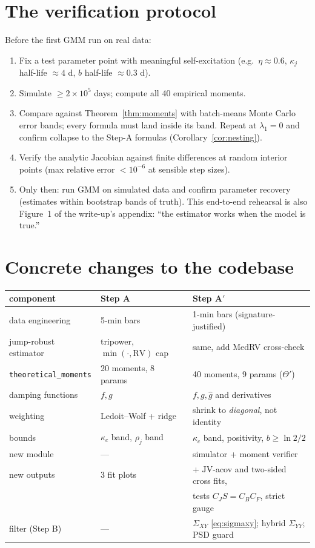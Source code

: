 \documentclass[11pt]{report}
\theoremstyle{definition}
\theoremstyle{remark}
\newcommand{\JV}{\mathrm{JV}}
\newcommand{\RV}{\mathrm{RV}}
\begin{document}
\section{The verification protocol}

Before the first GMM run on real data:
\begin{enumerate}
\item Fix a test parameter point with meaningful self-excitation
(e.g.\ $\eta\approx0.6$, $\kappa_{j}$ half-life $\approx4$ d, $b$ half-life
$\approx0.3$ d).
\item Simulate $\ge2\times10^{5}$ days; compute all 40 empirical moments.
\item Compare against Theorem~\ref{thm:moments} with batch-means Monte Carlo
error bands; every formula must land inside its band. Repeat at
$\lambda_{1}=0$ and confirm collapse to the Step-A formulas
(Corollary~\ref{cor:nesting}).
\item Verify the analytic Jacobian against finite differences at random
interior points (max relative error $<10^{-6}$ at sensible step sizes).
\item Only then: run GMM on simulated data and confirm parameter recovery
(estimates within bootstrap bands of truth). This end-to-end rehearsal is
also Figure~1 of the write-up's appendix: ``the estimator works when the
model is true.''
\end{enumerate}

\section{Concrete changes to the codebase}

\begin{center}
\small
\begin{tabular}{lll}
\toprule
component & Step A & Step A$'$\\
\midrule
data engineering & 5-min bars & 1-min bars (signature-justified)\\
jump-robust estimator & tripower, $\min(\cdot,\RV)$ cap & same, add MedRV cross-check\\
\texttt{theoretical\_moments} & 20 moments, 8 params & 40 moments, 9 params ($\Theta'$)\\
damping functions & $f,g$ & $f,g,\hat g$ and derivatives\\
weighting & Ledoit--Wolf + ridge & shrink to \emph{diagonal}, not identity\\
bounds & $\kappa_c$ band, $\rho_j$ band & $\kappa_c$ band, positivity, $b\ge\ln2/2$\\
new module & --- & simulator + moment verifier\\
new outputs & 3 fit plots & + $\JV$-acov and two-sided cross fits,\\
& & tests $C_JS=C_BC_F$, strict gauge\\
filter (Step B) & --- & $\Sigma_{XY}$ \eqref{eq:sigmaxy}; hybrid $\Sigma_{YY}$; PSD guard\\
\bottomrule
\end{tabular}
\end{center}
\end{document}
